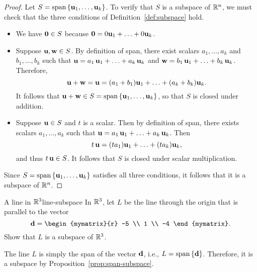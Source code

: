 \begin{proof}
  Let $S=\sspan\set{\vect{u}_1,\ldots,\vect{u}_k}$. To verify that $S$
  is a subspace of $\mathbb{R}^{n}$, we must check that the three conditions
  of Definition~\ref{def:subspace} hold.
  \begin{itemize}
  \item We have $\mbox{\bf 0}\in S$ because
    $\mbox{\bf 0}=0\mbox{\bf u}_1+\ldots+0\mbox{\bf u}_k$. 
  \item Suppose $\mbox{\bf u},\mbox{\bf w}\in S$.
    By definition of span, there exist scalars $a_1,\ldots,a_k$ and
    $b_1,\ldots,b_k$ such that
    $\mbox{\bf u}=a_1\,\mbox{\bf u}_1+\ldots+a_k\,\mbox{\bf u}_k$ and
    $\mbox{\bf w}=b_1\,\mbox{\bf u}_1+\ldots+b_k\,\mbox{\bf u}_k$.
    Therefore,
    \begin{equation*}
      \mbox{\bf u}+\mbox{\bf w} = \mbox{\bf u}=(a_1+b_1)\mbox{\bf u}_1+\ldots+(a_k+b_k)\mbox{\bf u}_k.
    \end{equation*}
    It follows that
    $\vect{u}+\vect{w}\in S=\sspan\set{\vect{u}_1,\ldots,\vect{u}_k}$,
    so that $S$ is closed under addition.
  \item Suppose $\mbox{\bf u}\in S$ and $t$ is a scalar. Then by
    definition of span, there exists scalars $a_1,\ldots,a_k$ such
    that $\mbox{\bf u}=a_1\,\mbox{\bf u}_1+\ldots+a_k\,\mbox{\bf u}_k$. Then
    \begin{equation*}
      t\,\mbox{\bf u}=(ta_1)\mbox{\bf u}_1+\ldots+(ta_k)\mbox{\bf u}_k,
    \end{equation*}
    and thus $t\,\mbox{\bf u}\in S$. It follows that $S$ is closed under
    scalar multiplication.
  \end{itemize}
  Since $S=\sspan\set{\vect{u}_1,\ldots,\vect{u}_k}$ satisfies all
  three conditions, it follows that it is a subspace of $\mathbb{R}^n$.
\end{proof}

\begin{example}{A line in $\mathbb{R}^3$}{line-subspace}
  In $\mathbb{R}^3$, let $L$ be the line through the origin that is
  parallel to the vector
  \begin{equation*}
    {\vect{d}}= \begin{mymatrix}{r} -5 \\ 1 \\ -4 \end{mymatrix}.
  \end{equation*}
  Show that $L$ is a subspace of $\mathbb{R}^3$.
\end{example}

\begin{solution}
  The line $L$ is simply the span of the vector $\mbox{\bf d}$, i.e.,
  $L=\sspan\set{\vect{d}}$. Therefore, it is a subspace by
  Proposition~\ref{prop:span-subspace}.
\end{solution}

